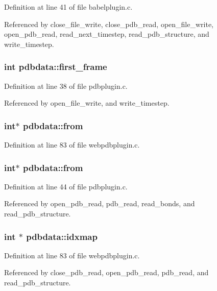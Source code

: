 Definition at line 41 of file babelplugin.c.

Referenced by close\_\-file\_\-write, close\_\-pdb\_\-read, open\_\-file\_\-write, open\_\-pdb\_\-read, read\_\-next\_\-timestep, read\_\-pdb\_\-structure, and write\_\-timestep.
\subsubsection{\setlength{\rightskip}{0pt plus 5cm}int pdbdata::first\_\-frame}\label{structpdbdata_m7}




Definition at line 38 of file pdbplugin.c.

Referenced by open\_\-file\_\-write, and write\_\-timestep.
\subsubsection{\setlength{\rightskip}{0pt plus 5cm}int$\ast$ pdbdata::from}\label{structpdbdata_m19}




Definition at line 83 of file webpdbplugin.c.
\subsubsection{\setlength{\rightskip}{0pt plus 5cm}int$\ast$ pdbdata::from}\label{structpdbdata_m13}




Definition at line 44 of file pdbplugin.c.

Referenced by open\_\-pdb\_\-read, pdb\_\-read, read\_\-bonds, and read\_\-pdb\_\-structure.
\subsubsection{\setlength{\rightskip}{0pt plus 5cm}int $\ast$ pdbdata::idxmap}\label{structpdbdata_m15}




Definition at line 83 of file webpdbplugin.c.

Referenced by close\_\-pdb\_\-read, open\_\-pdb\_\-read, pdb\_\-read, and read\_\-pdb\_\-structure.
